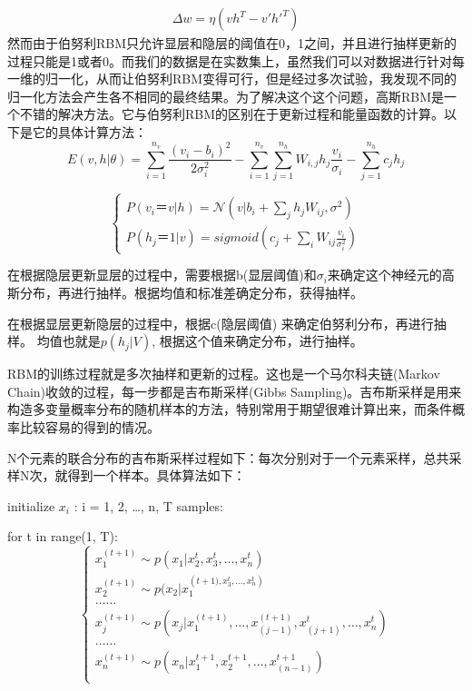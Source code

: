 	\begin{align}
	\Delta w = \eta(vh^T - v\prime {h\prime}^T)
	\end{align}
	然而由于伯努利RBM只允许显层和隐层的阈值在0，1之间，并且进行抽样更新的过程只能是1或者0。而我们的数据是在实数集上，虽然我们可以对数据进行针对每一维的归一化，从而让伯努利RBM变得可行，但是经过多次试验，我发现不同的归一化方法会产生各不相同的最终结果。为了解决这个这个问题，高斯RBM是一个不错的解决方法。它与伯努利RBM的区别在于更新过程和能量函数的计算。以下是它的具体计算方法：
	\begin{equation}
	E(v,h | \theta) = \sum\limits_{i=1}^{n_v}\frac{(v_i - b_i)^2}{2\sigma_i^2} - \sum\limits_{i=1}^{n_v}\sum\limits_{j=1}^{n_h} W_{i,j}h_j\frac{v_i}{\sigma_i} - \sum\limits_{j=1}^{n_h}c_jh_j
	\end{equation}
	
	\begin{equation}
	\begin{cases}
	P(v_i ＝ v|h) = \mathcal{N}(v | b_i + \sum\limits_{j}h_jW_{ij}, \sigma^2)\\
	P(h_j ＝ 1|v) = sigmoid(c_j + \sum\limits_i W_{ij} \frac{v_i}{\sigma_i^2})
	\end{cases}
	\end{equation}
	
	在根据隐层更新显层的过程中，需要根据b(显层阈值)和$\sigma_i$来确定这个神经元的高斯分布，再进行抽样。根据均值和标准差确定分布，获得抽样。
	
	在根据显层更新隐层的过程中，根据c(隐层阈值) 来确定伯努利分布，再进行抽样。 均值也就是$p(h_j| V)$, 根据这个值来确定分布，进行抽样。
	
	RBM的训练过程就是多次抽样和更新的过程。这也是一个马尔科夫链(Markov Chain)收敛的过程，每一步都是吉布斯采样(Gibbs Sampling)。吉布斯采样是用来构造多变量概率分布的随机样本的方法，特别常用于期望很难计算出来，而条件概率比较容易的得到的情况。
	
	N个元素的联合分布的吉布斯采样过程如下：每次分别对于一个元素采样，总共采样N次，就得到一个样本。具体算法如下：
	
	initialize $x_i$ : i = 1, 2, …, n, T samples:
	
	for t in range(1, T):\\
	\begin{equation}
	\begin{cases}
		x_1^{(t+1)} \sim p(x_1 | x_2^t, x_3^t,…, x_n^t)\\
		x_2^{(t+1)} \sim p(x_2 | x_1^({t+1)}, x_3^t,…, x_n^t)\\
		……\\
		x_j^{(t+1)} \sim p(x_j | x_1^{(t+1)},…,x_{(j-1)}^{(t+1)},x_{(j+1)}^t,…, x_n^t)\\
		……\\
		x_n^{(t+1)} \sim p(x_n | x_1^{t+1}, x_2^{t+1},…, x_{(n-1)}^{t+1})\\
	\end{cases}
	\end{equation}
	
